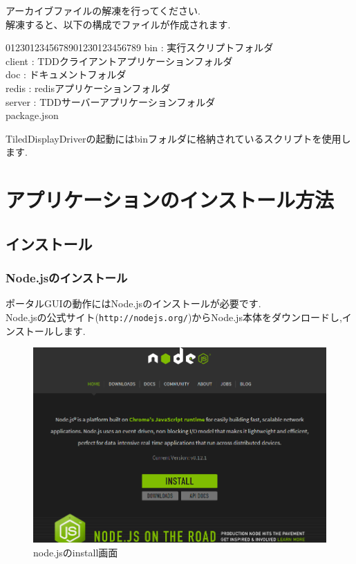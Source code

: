 \documentclass[a4paper,10pt,oneside]{jsbook}
\begin{document}
アーカイブファイルの解凍を行ってください.\\
解凍すると、以下の構成でファイルが作成されます.\\

\begin{tabbing}
0123\=01234567890123\=0123456789\kill
\>bin        \> : 実行スクリプトフォルダ\\
\>client     \> : TDDクライアントアプリケーションフォルダ\\
\>doc        \> : ドキュメントフォルダ\\
\>redis      \> : redisアプリケーションフォルダ\\
\>server     \> : TDDサーバーアプリケーションフォルダ\\
\>package.json
\end{tabbing}

TiledDisplayDriverの起動にはbinフォルダに格納されているスクリプトを使用します.\\

\newpage


\chapter{アプリケーションのインストール方法}

\section{インストール}

\subsection{Node.jsのインストール}
ポータルGUIの動作にはNode.jsのインストールが必要です.\\
Node.jsの公式サイト(\verb+http://nodejs.org/+)からNode.js本体をダウンロードし,インストールします.

\begin{figure}[htbp]
	\begin{center}
		\includegraphics[width=15.5cm]{image/NodeJS.png}
	\end{center}
	\caption{node.jsのinstall画面}
	\label{fig:nodejs_home}
\end{figure}
\end{document}
